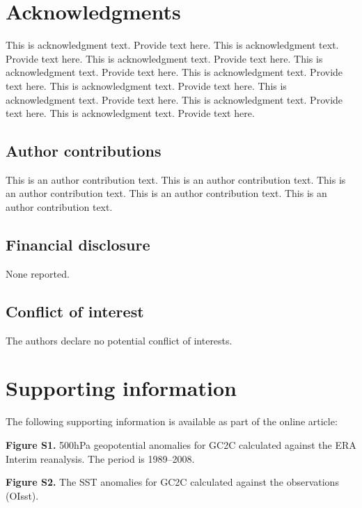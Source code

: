 \documentclass[AMA,STIX1COL]{WileyNJD-v2}
\begin{document}

\section*{Acknowledgments}
This is acknowledgment text.\cite{Kenamond2013} Provide text here. This is acknowledgment text. Provide text here. This is acknowledgment text. Provide text here. This is acknowledgment text. Provide text here. This is acknowledgment text. Provide text here. This is acknowledgment text. Provide text here. This is acknowledgment text. Provide text here. This is acknowledgment text. Provide text here. This is acknowledgment text. Provide text here. 


\subsection*{Author contributions}

This is an author contribution text. This is an author contribution text. This is an author contribution text. This is an author contribution text. This is an author contribution text. 

\subsection*{Financial disclosure}

None reported.

\subsection*{Conflict of interest}

The authors declare no potential conflict of interests.

\section*{Supporting information}

The following supporting information is available as part of the online article:

\noindent
\textbf{Figure S1.}
{500{\uns}hPa geopotential anomalies for GC2C calculated against the ERA Interim reanalysis. The period is 1989--2008.}

\noindent
\textbf{Figure S2.}
{The SST anomalies for GC2C calculated against the observations (OIsst).}
\end{document}
